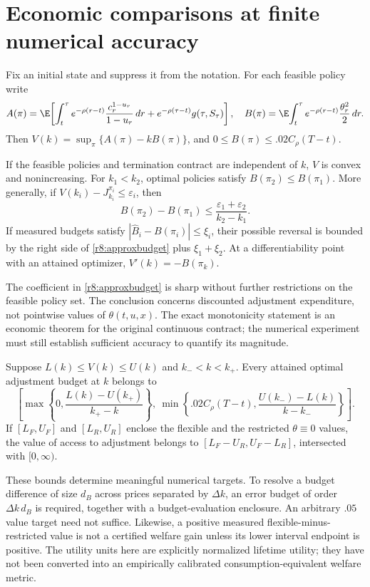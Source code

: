 \section{Economic comparisons at finite numerical accuracy}\label{r8:economics}
Fix an initial state and suppress it from the notation. For each feasible policy write
\[
 A(\pi)=\E\!\left[\int_t^\tau e^{-\rho(r-t)}\frac{c_r^{1-u_r}}{1-u_r}\,dr+e^{-\rho(\tau-t)}g(\tau,S_\tau)\right],
 \quad B(\pi)=\E\!\int_t^\tau e^{-\rho(r-t)}\frac{\theta_r^2}{2}\,dr.
\]
Then $V(k)=\sup_\pi\{A(\pi)-kB(\pi)\}$, and $0\leq B(\pi)\leq .02C_\rho(T-t)$.
\begin{theorem}\label{r8:cost}
If the feasible policies and termination contract are independent of $k$, $V$ is convex and nonincreasing. For $k_1<k_2$, optimal policies satisfy $B(\pi_2)\leq B(\pi_1)$. More generally, if $V(k_i)-J_{k_i}^{\pi_i}\leq\varepsilon_i$, then
\begin{equation}
 B(\pi_2)-B(\pi_1)\leq\frac{\varepsilon_1+\varepsilon_2}{k_2-k_1}.\label{r8:approxbudget}
\end{equation}
If measured budgets satisfy $|\widehat B_i-B(\pi_i)|\leq\xi_i$, their possible reversal is bounded by the right side of \eqref{r8:approxbudget} plus $\xi_1+\xi_2$. At a differentiability point with an attained optimizer, $V'(k)=-B(\pi_k)$.
\end{theorem}
The coefficient in \eqref{r8:approxbudget} is sharp without further restrictions on the feasible policy set. The conclusion concerns discounted adjustment expenditure, not pointwise values of $\theta(t,u,x)$. The exact monotonicity statement is an economic theorem for the original continuous contract; the numerical experiment must still establish sufficient accuracy to quantify its magnitude.

\begin{proposition}\label{r8:intervalecon}
Suppose $L(k)\leq V(k)\leq U(k)$ and $k_-<k<k_+$. Every attained optimal adjustment budget at $k$ belongs to
\begin{equation}
 \left[\max\!\left\{0,\frac{L(k)-U(k_+)}{k_+-k}\right\},\
 \min\!\left\{.02C_\rho(T-t),\frac{U(k_-)-L(k)}{k-k_-}\right\}\right].\label{r8:budgetinterval}
\end{equation}
If $[L_F,U_F]$ and $[L_R,U_R]$ enclose the flexible and the restricted $\theta\equiv0$ values, the value of access to adjustment belongs to $[L_F-U_R,U_F-L_R]$, intersected with $[0,\infty)$.
\end{proposition}
These bounds determine meaningful numerical targets. To resolve a budget difference of size $d_B$ across prices separated by $\Delta k$, an error budget of order $\Delta k\,d_B$ is required, together with a budget-evaluation enclosure. An arbitrary $.05$ value target need not suffice. Likewise, a positive measured flexible-minus-restricted value is not a certified welfare gain unless its lower interval endpoint is positive. The utility units here are explicitly normalized lifetime utility; they have not been converted into an empirically calibrated consumption-equivalent welfare metric.

